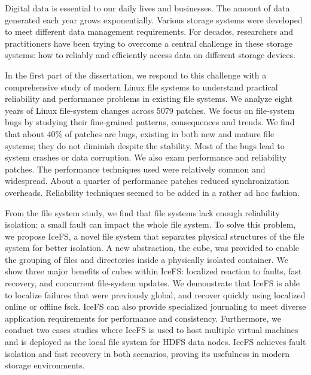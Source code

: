 
\vcinfo{}



Digital data is essential to our daily lives and businesses. 
The amount of data generated each year grows exponentially. Various
storage systems were developed to meet different data management
requirements. For decades, researchers and practitioners have been
trying to overcome a central challenge in these storage systems: how
to reliably and efficiently access data on different storage devices.  

In the first part of the dissertation, we respond to this challenge
with a comprehensive study of modern Linux file systems to understand 
practical reliability and performance problems in existing file
systems. We analyze eight years of Linux file-system changes across
5079 patches. We focus on file-system bugs by studying their
fine-grained patterns, consequences and trends. We find that about
40\% of patches are bugs, existing in both new and mature
file systems; they do not diminish despite the stability. Most of the
bugs lead to system crashes or data corruption. We also exam
performance and reliability patches. The performance techniques used
were relatively common and widespread. About a quarter of performance 
patches reduced synchronization overheads. Reliability techniques
seemed to be added in a rather ad hoc fashion. 

From the file system study, we find that file systems lack enough
reliability isolation: a small fault can impact the whole file system.
To solve this problem, we propose IceFS, a novel file system that
separates physical structures of the file system for better isolation.
A new abstraction, the cube, was provided to enable the grouping of
files and directories inside a physically isolated 
container.  We show three major benefits of cubes within IceFS:
localized reaction to faults, fast recovery, and concurrent file-system
updates. We demonstrate that IceFS is able to localize failures that
were previously global, and recover quickly using localized online or
offline fsck. IceFS can also provide specialized journaling to meet diverse
application requirements for performance and consistency.
Furthermore, we conduct two cases studies where IceFS is used to
host multiple virtual machines and is deployed as the local file
system for HDFS data nodes. IceFS achieves fault isolation and fast
recovery in both scenarios, proving its usefulness in modern storage 
environments.

